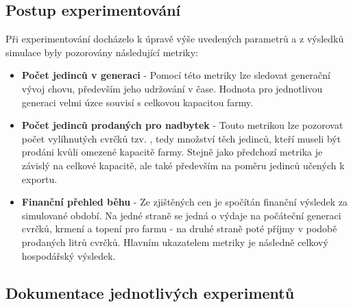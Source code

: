 \documentclass[11pt, a4paper, titlepage]{article}
\begin{document}
    \subsection{Postup experimentování}

    Při experimentování docházelo k úpravě výše uvedených parametrů a z výsledků simulace byly pozorovány následující
    metriky:

    \begin{itemize}
        \item \textbf{Počet jedinců v generaci} - Pomocí této metriky lze sledovat generační vývoj chovu, především
        jeho udržování v čase. Hodnota pro jednotlivou generaci velmi úzce souvisí s celkovou kapacitou farmy.
        \item \textbf{Počet jedinců prodaných pro nadbytek} - Touto metrikou lze pozorovat počet vylíhnutých cvrčků tzv. ,
        tedy množství těch jedinců, kteří museli být prodáni kvůli omezené kapacitě farmy. Stejně jako předchozí metrika
        je závislý na celkové kapacitě, ale také především na poměru jedinců učených k exportu.
        \item \textbf{Finanční přehled běhu} - Ze zjištěných cen je spočítán finanční výsledek za simulované období.
        Na jedné straně se jedná o výdaje na počáteční generaci cvrčků, krmení a topení pro farmu - na druhé straně poté
        příjmy v podobě prodaných litrů cvrčků. Hlavním ukazatelem metriky je následně celkový hospodářský výsledek.
    \end{itemize}

    \subsection{Dokumentace jednotlivých experimentů}
\end{document}
